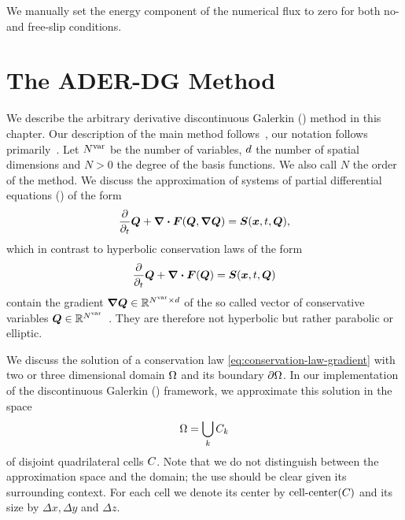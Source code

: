 We manually set the energy component of the numerical flux to zero for both no- and free-slip conditions.
\section{The ADER-DG Method}\label{sec:ader-dg}
We describe the arbitrary derivative discontinuous Galerkin (\aderdg) method in this chapter.
Our description of the main method follows~\cite{dumbser2008unified,dumbser2010arbitrary,dumbser2018efficient}, our notation follows primarily~\cite{dumbser2018efficient}.
Let $N^{\text{var}}$ be the number of variables, $d$ the number of spatial dimensions and $N > 0$ the degree of the basis functions.
We also call $N$ the order of the method.
We discuss the approximation of systems of partial differential equations (\pde) of the form
\begin{equation}
  \label{eq:conservation-law-gradient}
 \frac{\partial}{\partial_t}  \Q + \div \flux(\Q, \gradQ) = \source(\bm{x}, t, \Q),
\end{equation}
which in contrast to hyperbolic conservation laws of the form
\begin{equation}
  \label{eq:conservation-law}
 \frac{\partial}{\partial_t}  \Q + \div \flux(\Q) = \source(\bm{x}, t, \Q)
\end{equation}
contain the gradient $\gradQ \in \mathbb{R}^{\NVar \times \dimensions}$ of the so called vector of conservative variables $\bm{Q} \in \mathbb{R}^{N^{\text{var}}}$~\cite{dumbser2010arbitrary}.
They are therefore not hyperbolic but rather parabolic or elliptic.

We discuss the solution of a conservation law \cref{eq:conservation-law-gradient} with two or three dimensional domain $\Omega$ and its boundary $\partial \Omega$.
In our implementation of the discontinuous Galerkin (\dg) framework, we approximate this solution in the space
\begin{equation}
  \label{eq:dg-space}
  \broken = \bigcup_k \cell[k]
\end{equation}
of disjoint quadrilateral cells $C_{}$.
Note that we do not distinguish between the approximation space and the domain; the use should be clear given its surrounding context.
For each cell we denote its center by $\operatorname{cell-center} (C_{})$ and its size by $\Delta x, \Delta y$ and $\Delta z$.

